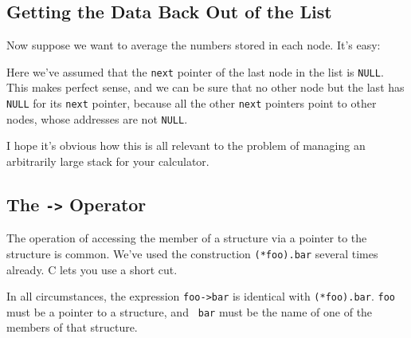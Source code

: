 \subsection{Getting the Data Back Out of the List}

Now suppose we want to average the numbers stored in each node.  It's
easy:

\begin{flushleft}
\verb% struct listnode *current;%  \\*
\verb% int average;%  \\*
\verb% long int sum = 0L;%  \\*
\verb% int nodecount = 0;%  \\*
\verb% %  \\*
\verb% for (current = firstnode; % \\*
\verb%      current != NULL; %  \\*
\verb%      current = (*current).next) {%  \\*
\verb%   sum += (*current).data; %  \\*
\verb%   nodecount += 1;%  \\*
\verb% }%  \\*
\verb% %  \\*
\verb% average = sum / nodecount; /* round down */ %  \\*
\end{flushleft}

Here we've assumed that the {\tt next} pointer of the last node in the
list is {\tt NULL}.  This makes perfect sense, and we can be sure that
no other node but the last has {\tt NULL} for its {\tt next} pointer,
because all the other {\tt next} pointers point to other nodes, whose
addresses are not {\tt NULL}. 

I hope it's obvious how this is all relevant to the problem of managing
an arbitrarily large stack for your calculator.  

\subsection{The {\tt ->} Operator}

The operation of accessing the member of a structure via a pointer to
the structure is common.  We've used the construction {\tt (*foo).bar}
several times already.  C lets you use a short cut.

In all circumstances, the expression {\tt foo->bar} is identical with
{\tt (*foo).bar}.  {\tt foo} must be a pointer to a structure, and {\tt
bar} must be the name of one of the members of that structure. 


